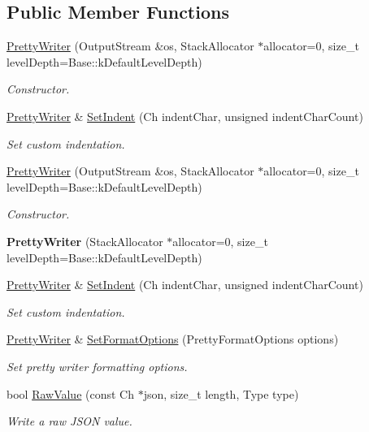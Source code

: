 \subsection*{Public Member Functions}
\begin{DoxyCompactItemize}
\item 
\hyperlink{classPrettyWriter_a83f9be5c5d595a08636962e4ddd27b60}{Pretty\+Writer} (Output\+Stream \&os, Stack\+Allocator $\ast$allocator=0, size\+\_\+t level\+Depth=Base\+::k\+Default\+Level\+Depth)
\begin{DoxyCompactList}\small\item\em Constructor. \end{DoxyCompactList}\item 
\hyperlink{classPrettyWriter}{Pretty\+Writer} \& \hyperlink{classPrettyWriter_afe3a560009b5cd6a79a1e91c807387ad}{Set\+Indent} (Ch indent\+Char, unsigned indent\+Char\+Count)
\begin{DoxyCompactList}\small\item\em Set custom indentation. \end{DoxyCompactList}\item 
\hyperlink{classPrettyWriter_a83f9be5c5d595a08636962e4ddd27b60}{Pretty\+Writer} (Output\+Stream \&os, Stack\+Allocator $\ast$allocator=0, size\+\_\+t level\+Depth=Base\+::k\+Default\+Level\+Depth)
\begin{DoxyCompactList}\small\item\em Constructor. \end{DoxyCompactList}\item 
\mbox{\label{classPrettyWriter_a48086071ad61f9c0f81879b1d39fbfd6}} 
{\bfseries Pretty\+Writer} (Stack\+Allocator $\ast$allocator=0, size\+\_\+t level\+Depth=Base\+::k\+Default\+Level\+Depth)
\item 
\hyperlink{classPrettyWriter}{Pretty\+Writer} \& \hyperlink{classPrettyWriter_afe3a560009b5cd6a79a1e91c807387ad}{Set\+Indent} (Ch indent\+Char, unsigned indent\+Char\+Count)
\begin{DoxyCompactList}\small\item\em Set custom indentation. \end{DoxyCompactList}\item 
\hyperlink{classPrettyWriter}{Pretty\+Writer} \& \hyperlink{classPrettyWriter_ab0592e7a568bba9252ad349d14a697ae}{Set\+Format\+Options} (Pretty\+Format\+Options options)
\begin{DoxyCompactList}\small\item\em Set pretty writer formatting options. \end{DoxyCompactList}\item 
bool \hyperlink{classPrettyWriter_adb893de36ec92b9f2431a8f8f0a6be83}{Raw\+Value} (const Ch $\ast$json, size\+\_\+t length, Type type)
\begin{DoxyCompactList}\small\item\em Write a raw J\+S\+ON value. \end{DoxyCompactList}\end{DoxyCompactItemize}
